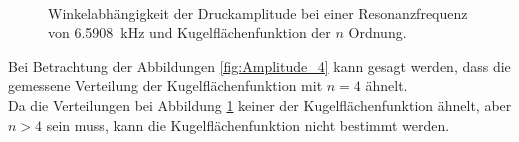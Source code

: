 \begin{figure}
    \\
    \caption{Winkelabhängigkeit der Druckamplitude bei einer Resonanzfrequenz von \SI{6.5908}{\kilo\hertz} und Kugelflächenfunktion der $n$ Ordnung.}
    \label{fig:Amplitude_6}
\end{figure}
\FloatBarrier
Bei Betrachtung der Abbildungen \ref{fig:Amplitude_4} kann gesagt werden, 
dass die gemessene Verteilung der Kugelflächenfunktion mit $n=4$ ähnelt. \\
Da die Verteilungen bei Abbildung \ref{fig:Amplitude_6} keiner der Kugelflächenfunktion ähnelt, aber
$n>4$ sein muss, kann die Kugelflächenfunktion nicht bestimmt werden.
